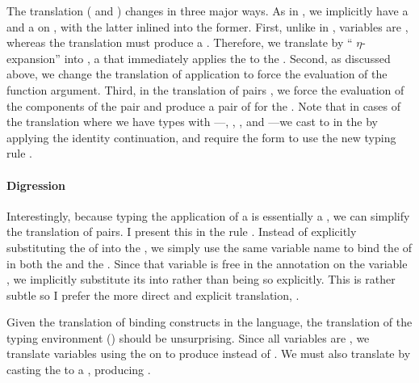 \FigCBVTerms[h!]
\FigCBVTermsPairs[h!]
\FigCBVEnv[h!]
The  translation ( and
  ) changes in three major ways.
As in , we implicitly have a  and a  on 
, with the latter inlined into the former.
First, unlike in \cbnname{}, variables are , whereas the translation must
produce a .
Therefore, we translate \im{\sx} by `` \(\eta\)-expansion'' into
\im{\cpsnfune{\cpsalpha}{\cpsnfune{\cpsk}{\cpsappe{\cpsk}{\cpsx}}}}, a
 that immediately applies the  to the
.
Second, as discussed above, we change the translation of application
 to force the evaluation of the function argument.
Third, in the translation of pairs , we force the
evaluation of the components of the pair and produce a pair of  for
the .
Note that in cases of the translation where we have types with
---, , , and
---we cast  to  in the
 by applying the identity continuation, and require the
 form to use the new typing rule .

\paragraph{Digression}
  Interestingly, because typing the application of a  is
  essentially a , we can simplify the translation of pairs.
  I present this in the rule .
  Instead of explicitly substituting the  of \im{\cpseone} into the
   \im{\cpsB}, we simply use the same variable name \im{\cpsx} to
  bind the  of \im{\cpseone} in both the  and the .
  Since that variable is free in the  annotation \im{\cpsB} on the
  variable \im{\cpsxtwo}, we implicitly substitute its  into \im{\cpsB}
  rather than being so explicitly.
  This is rather subtle so I prefer the more direct and explicit translation,
  .

Given the translation of binding constructs in the language, the translation of
the typing environment () should be unsurprising.
Since all variables are , we translate  variables
\im{\sx : \sA} using the  on  to produce
\im{\cpsx : \sA^+} instead of \im{\cpsx : \sA^\div}.
We must also translate   \im{\sx = \se : \sA} by
casting the  to a , producing \im{\cpsx =
  \cpsncappe{\se^\div}{\sA^+}{\cpsidk} : \sA^+}.

